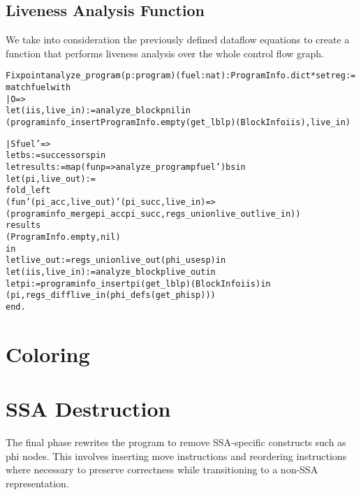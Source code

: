 \subsection{Liveness Analysis Function}

We take into consideration the previously defined dataflow equations to create a function that performs liveness analysis over the whole control flow graph.

\begin{alltt}
Fixpoint analyze_program (p : program) (fuel : nat) : ProgramInfo.dict * set reg :=
  match fuel with
  | O =>
    let (iis, live_in) := analyze_block p nil in
    (programinfo_insert ProgramInfo.empty (get_lbl p) (BlockInfo iis), live_in)

  | S fuel' =>
    let bs := successors p in
    let results := map (fun p => analyze_program p fuel') bs in
    let (pi, live_out) :=
      fold_left
        (fun '(pi_acc, live_out) '(pi_succ, live_in) =>
          (programinfo_merge pi_acc pi_succ, regs_union live_out live_in))
        results
        (ProgramInfo.empty, nil)
    in
    let live_out := regs_union live_out (phi_uses p) in
    let (iis, live_in) := analyze_block p live_out in
    let pi := programinfo_insert pi (get_lbl p) (BlockInfo iis) in
    (pi, regs_diff live_in (phi_defs (get_phis p)))
  end.
\end{alltt}

\section{Coloring}



\section{SSA Destruction}

The final phase rewrites the program to remove SSA-specific constructs such as phi nodes. This involves inserting move instructions and reordering instructions where necessary to preserve correctness while transitioning to a non-SSA representation.